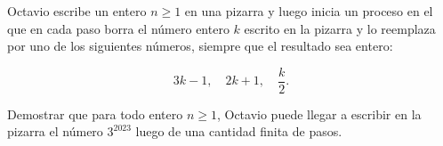 Octavio escribe un entero $n \geq 1$ en una pizarra y luego inicia un proceso en el que en cada paso borra el número entero $k$ escrito en la pizarra y lo reemplaza por uno de los siguientes números, siempre que el resultado sea entero:

\[3 k-1, \quad 2 k+1, \quad \frac{k}{2}.\]

Demostrar que para todo entero $n \geq 1$, Octavio puede llegar a escribir en la pizarra el número $3^{2023}$ luego de una cantidad finita de pasos.